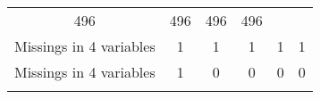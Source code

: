 \documentclass[]{book}
\begin{document}
\begin{longtable}[]{@{}cccccc@{}}
\begin{minipage}[t]{0.12\columnwidth}
496\strut
\end{minipage} & \begin{minipage}[t]{0.12\columnwidth}\centering\strut
496\strut
\end{minipage} & \begin{minipage}[t]{0.12\columnwidth}\centering\strut
496\strut
\end{minipage} & \begin{minipage}[t]{0.12\columnwidth}\centering\strut
496\strut
\end{minipage}\tabularnewline
\begin{minipage}[t]{0.28\columnwidth}\centering\strut
Missings in 4 variables\strut
\end{minipage} & \begin{minipage}[t]{0.07\columnwidth}\centering\strut
1\strut
\end{minipage} & \begin{minipage}[t]{0.12\columnwidth}\centering\strut
1\strut
\end{minipage} & \begin{minipage}[t]{0.12\columnwidth}\centering\strut
1\strut
\end{minipage} & \begin{minipage}[t]{0.12\columnwidth}\centering\strut
1\strut
\end{minipage} & \begin{minipage}[t]{0.12\columnwidth}\centering\strut
1\strut
\end{minipage}\tabularnewline
\begin{minipage}[t]{0.28\columnwidth}\centering\strut
Missings in 4 variables\strut
\end{minipage} & \begin{minipage}[t]{0.07\columnwidth}\centering\strut
1\strut
\end{minipage} & \begin{minipage}[t]{0.12\columnwidth}\centering\strut
0\strut
\end{minipage} & \begin{minipage}[t]{0.12\columnwidth}\centering\strut
0\strut
\end{minipage} & \begin{minipage}[t]{0.12\columnwidth}\centering\strut
0\strut
\end{minipage} & \begin{minipage}[t]{0.12\columnwidth}\centering\strut
0\strut
\end{minipage}\tabularnewline
\begin{minipage}[t]{0.28\columnwidth}\centering\strut

\end{minipage}
\end{longtable}
\end{document}
